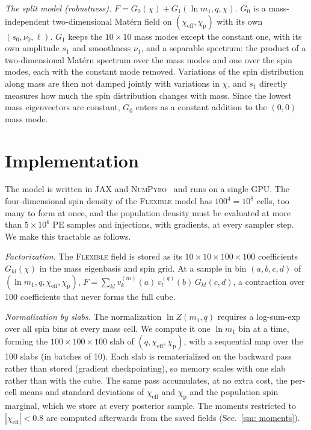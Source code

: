 \documentclass[%
 reprint,
 amsmath,amssymb,
 aps,
 prl,
 nofootinbib,nobibnotes,
 floatfix,
]{revtex4-2}
\newcommand{\chieff}{\ensuremath{\chi_{\mathrm{eff}}}}
\newcommand{\chip}{\ensuremath{\chi_{\mathrm{p}}}}
\newcommand{\flexiblespins}{\textsc{Flexible}\xspace}
\begin{document}
\textit{The split model (robustness).} $F = G_0(\chi) + G_1(\ln m_1, q, \chi)$. $G_0$ is a mass-independent two-dimensional Mat\'ern field on $(\chieff, \chip)$ with its own $(s_0, \nu_0, \ell)$. $G_1$ keeps the $10 \times 10$ mass modes except the constant one, with its own amplitude $s_1$ and smoothness $\nu_1$, and a separable spectrum: the product of a two-dimensional Mat\'ern spectrum over the mass modes and one over the spin modes, each with the constant mode removed. Variations of the spin distribution along mass are then not damped jointly with variations in $\chi$, and $s_1$ directly measures how much the spin distribution changes with mass. Since the lowest mass eigenvectors are constant, $G_0$ enters as a constant addition to the $(0, 0)$ mass mode.

\section{Implementation}
\label{sm: implementation}

The model is written in \textsc{JAX} and \textsc{NumPyro}~\cite{Phan:2019numpyro} and runs on a single GPU. The four-dimensional spin density of the \flexiblespins model has $100^4 = 10^8$ cells, too many to form at once, and the population density must be evaluated at more than $5 \times 10^6$ \ac{PE} samples and injections, with gradients, at every sampler step. We make this tractable as follows.

\textit{Factorization.} The \flexiblespins field is stored as its $10 \times 10 \times 100 \times 100$ coefficients $G_{kl}(\chi)$ in the mass eigenbasis and spin grid. At a sample in bin $(a, b, c, d)$ of $(\ln m_1, q, \chieff, \chip)$, $F = \sum_{kl} v^{(m)}_k(a)\, v^{(q)}_l(b)\, G_{kl}(c, d)$, a contraction over 100 coefficients that never forms the full cube.

\textit{Normalization by slabs.} The normalization $\ln Z(m_1, q)$ requires a log-sum-exp over all spin bins at every mass cell. We compute it one $\ln m_1$ bin at a time, forming the $100 \times 100 \times 100$ slab of $(q, \chieff, \chip)$, with a sequential map over the 100 slabs (in batches of 10). Each slab is rematerialized on the backward pass rather than stored (gradient checkpointing), so memory scales with one slab rather than with the cube. The same pass accumulates, at no extra cost, the per-cell means and standard deviations of $\chieff$ and $\chip$ and the population spin marginal, which we store at every posterior sample. The moments restricted to $|\chieff| < 0.8$ are computed afterwards from the saved fields (Sec.~\ref{sm: moments}).
\end{document}
